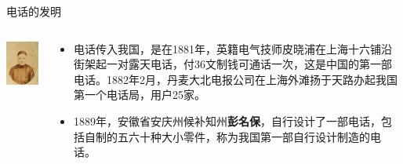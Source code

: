 \documentclass{ctexbeamer}
\begin{document}
\begin{frame}{电话的发明}
  \begin{columns}
    \begin{column}{0.35\linewidth}
      \includegraphics[width=3.5cm]{pengmingbao}
    \end{column}
    \begin{column}{0.65\linewidth}
      \begin{itemize}
        \item 电话传入我国，是在1881年，英籍电气技师皮晓浦在上海十六铺沿街架起一对露天电话，付36文制钱可通话一次，这是中国的第一部电话。1882年2月，丹麦大北电报公司在上海外滩扬于天路办起我国第一个电话局，用户25家。
        \item 1889年，安徽省安庆州候补知州\textbf{彭名保}，自行设计了一部电话，包括自制的五六十种大小零件，称为我国第一部自行设计制造的电话。
      \end{itemize}
    \end{column}
  \end{columns}
\end{frame}
\end{document}
